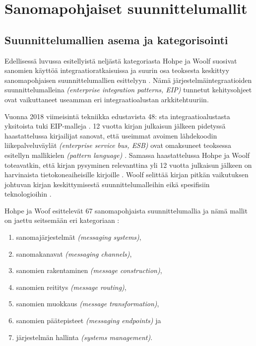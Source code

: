 \chapter{Sanomapohjaiset suunnittelumallit} \label{chap:sanomapohjaiset}

\section{Suunnittelumallien asema ja kategorisointi}
Edellisessä luvussa esitellyistä neljästä kategoriasta Hohpe ja Woolf suosivat sanomien käyttöä integraatioratkaisuissa ja suurin osa teoksesta keskittyy sanomapohjaisen suunnittelumallien esittelyyn \citep[sivu~76]{Hohpe2004}. Nämä järjestelmäintegraatioiden suunnittelumalleina \textit{(enterprise integration patterns, EIP)} tunnetut kehitysohjeet ovat vaikuttaneet useamman eri integraatioalustan arkkitehtuuriin. 

Vuonna 2018 viimeisintä tekniikka edustavista 48: sta integraatioalustasta yksitoista tuki EIP-malleja \citep{Freire2019}.
12 vuotta kirjan julkaisun jälkeen pidetyssä haastattelussa kirjailijat sanovat, että useimmat avoimen lähdekoodin liikepalveluväylät \textit{(enterprise service bus, ESB)} ovat omaksuneet teoksessa esitellyn mallikielen \textit{(pattern language)} \citep{Zimmermann2016}.
Samassa haastattelussa Hohpe ja Woolf toteavatkin, että kirjan pysyminen relevanttina yli 12 vuotta julkaisun jälkeen on harvinaista tietokoneaiheisille kirjoille \citep{Zimmermann2016}. Woolf selittää kirjan pitkän vaikutuksen johtuvan kirjan keskittymisestä suunnittelumalleihin eikä spesifisiin teknologioihin \citep{Zimmermann2016}.


Hohpe ja Woof esittelevät 67 sanomapohjaista suunnittelumallia ja nämä mallit on jaettu seitsemään eri kategoriaan \citep{Hohpe2004}:


\begin{enumerate}
   \item sanomajärjestelmät \textit{(messaging systems)},
   \item sanomakanavat \textit{(messaging channels)},
   \item sanomien rakentaminen \textit{(message construction)},
   \item sanomien reititys \textit{(message routing)},
   \item sanomien muokkaus \textit{(message transformation)},
   \item sanomien päätepisteet \textit{(messaging endpoints)} ja
   \item järjestelmän hallinta \textit{(systems management)}.
\end{enumerate}

